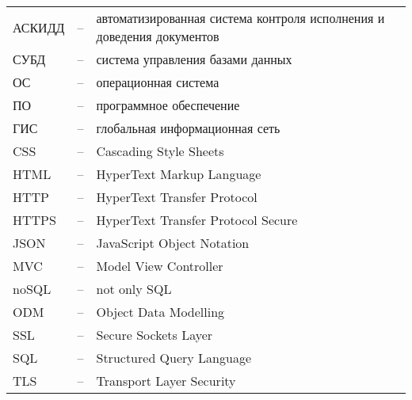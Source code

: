 \noindent\begin{tabular}{p{2cm}p{0.3cm}p{14.2cm}}
АСКИДД & -- & автоматизированная система контроля исполнения и доведения документов \\
СУБД & -- & система управления базами данных \\
ОС & -- & операционная система \\
ПО & -- & программное обеспечение \\
ГИС & -- & глобальная информационная сеть\\
CSS & -- & Cascading Style Sheets\\
HTML & -- & HyperText Markup Language\\
HTTP & -- & HyperText Transfer Protocol\\
HTTPS & -- & HyperText Transfer Protocol Secure\\
JSON & -- & JavaScript Object Notation\\
MVC & -- & Model View Controller\\
noSQL & -- & not only SQL\\
ODM & -- & Object Data Modelling\\
SSL & -- & Secure Sockets Layer\\
SQL & -- & Structured Query Language\\
TLS & -- & Transport Layer Security\\
\end{tabular}
